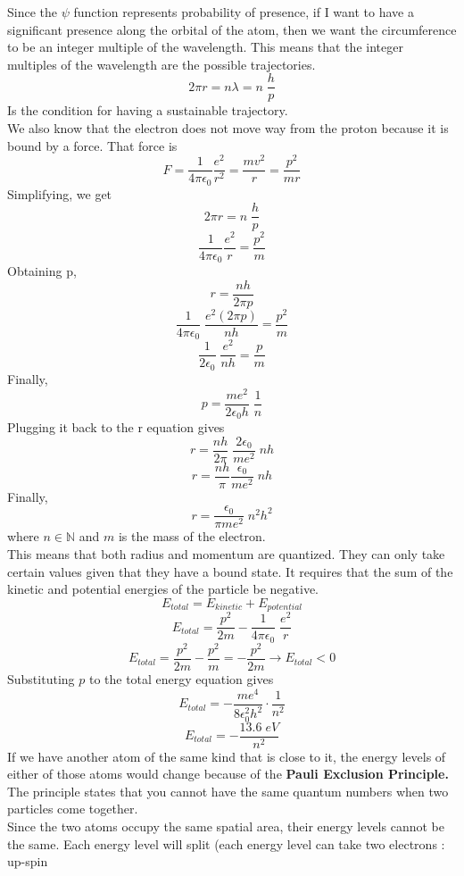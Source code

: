 \documentclass{article}
\begin{document}
\vspace{8pt}
\noindent 
Since the $\psi$ function represents probability of presence, if I want to have a 
significant presence along the orbital of the atom, then we want the circumference 
to be an integer multiple of the wavelength. This means that the integer 
multiples of the wavelength are the possible trajectories. 
$$2\pi r = n\lambda = n \; \frac{h}{p}$$
Is the condition for having a sustainable trajectory. 
\vspace{8pt}
\\ We also know that the electron does not move way from the proton because it is 
bound by a force. That force is $$F = \frac{1}{4\pi\epsilon_{0}} \frac{e^2}{r^2}
= \frac{mv^2}{r} = \frac{p^2}{mr}$$
\newpage 
\noindent 
Simplifying, we get $$2\pi r = n \; \frac{h}{p}$$
$$\frac{1}{4\pi \epsilon_0} \frac{e^2}{r} = \frac{p^2}{m}$$
Obtaining p, $$r = \frac{nh}{2\pi p}$$
$$\frac{1}{4\pi\epsilon_0} \; \frac{e^2 (2\pi p)}{nh} = \frac{p^2}{m} $$
$$\frac{1}{2\epsilon_0} \; \frac{e^2}{nh} = \frac{p}{m}$$
Finally, 
$$\boxed{p = \frac{me^2}{2\epsilon_0 h} \; \frac{1}{n}}$$
Plugging it back to the r equation gives 
$$r = \frac{nh}{2\pi} \; \frac{2\epsilon_0}{me^2} \; nh$$
$$r=  \frac{nh}{\pi} \frac{\epsilon_0}{me^2} \; nh$$
Finally, 
$$\boxed{r = \frac{\epsilon_0}{\pi me^2} \; n^2 h^2}$$
where $n \in \mathbb{N}$ and $m$ is the mass of the electron. 
\vspace{8pt}
\\ This means that both radius and momentum are quantized. They can only take certain 
values given that they have a bound state. It requires that the sum of the kinetic and 
potential energies of the particle be negative. 
$$E_{total} = E_{kinetic} + E_{potential}$$
$$E_{total} = \frac{p^2}{2m} - \frac{1}{4\pi\epsilon_0} \; \frac{e^2}{r} $$ 
$$E_{total} = \frac{p^2}{2m} - \frac{p^2}{m} = -\frac{p^2}{2m} \rightarrow E_{total} < 0$$
Substituting $p$ to the total energy equation gives 
$$E_{total} = -\frac{m e^4}{8\epsilon_0^2 h^2} \cdot \frac{1}{n^2}$$ 
$$\boxed{E_{total} = -\frac{13.6\; eV}{n^2}}$$
\newpage 
\noindent 
If we have another atom of the same kind that is close to it, the energy levels of either
of those atoms would change because of the \textbf{Pauli Exclusion Principle.} The 
principle states that you cannot have the same quantum numbers when two particles come
together. 
\vspace{8pt}
\\ Since the two atoms occupy the same spatial area, their energy levels cannot be the 
same. Each energy level will split (each energy level can take two electrons : up-spin
\end{document}
